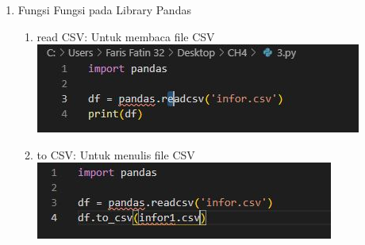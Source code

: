 \begin{enumerate}
\item Fungsi Fungsi pada Library Pandas\\
\begin{enumerate}

\item read CSV: Untuk membaca file CSV\\
\includegraphics{gambar/csv5.jpg}

\item to CSV: Untuk menulis file CSV\\
\includegraphics{gambar/csv6.jpg}
\end{enumerate}

\end{enumerate}

